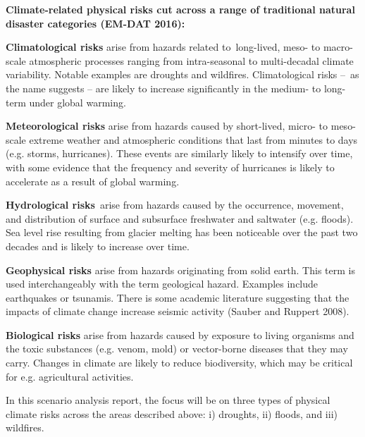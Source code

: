 \documentclass[10pt,table,a4]{article}\usepackage[]{graphicx}\usepackage[]{color}
\begin{document}
	
	\begin{multicols}{2}
		\textbf{Climate-related physical risks cut across a range of traditional natural disaster categories (EM-DAT 2016):}
		
		\textbf{Climatological risks} arise from hazards related to long-lived, meso- to macro-scale atmospheric processes ranging from intra-seasonal to multi-decadal climate variability. Notable examples are droughts and wildfires. Climatological risks – as the name suggests – are likely to increase significantly in the medium- to long-term under global warming.
		
		\textbf{Meteorological risks} arise from hazards caused by short-lived, micro- to meso-scale extreme weather and atmospheric conditions that last from minutes to days (e.g. storms, hurricanes). These events are similarly likely to intensify over time, with some evidence that the frequency and severity of hurricanes is likely to accelerate as a result of global warming.
		
		\textbf{Hydrological risks} arise from hazards caused by the occurrence, movement, and distribution of surface and subsurface freshwater and saltwater (e.g. floods). Sea level rise resulting from glacier melting has been noticeable over the past two decades and is likely to increase over time.
		
		\textbf{Geophysical risks} arise from hazards originating from solid earth. This term is used interchangeably with the term geological hazard. Examples include earthquakes or tsunamis. There is some academic literature suggesting that the impacts of climate change increase seismic activity (Sauber and Ruppert 2008).
		
		\textbf{Biological risks} arise from hazards caused by exposure to living organisms and the toxic substances (e.g. venom, mold) or vector-borne diseases that they may carry. Changes in climate are likely to reduce biodiversity, which may be critical for e.g. agricultural activities.
		
		In this scenario analysis report, the focus will be on three types of physical climate risks across the areas described above: i) droughts, ii) floods, and iii) wildfires.
		
		
	\end{multicols}
	
\end{document}
